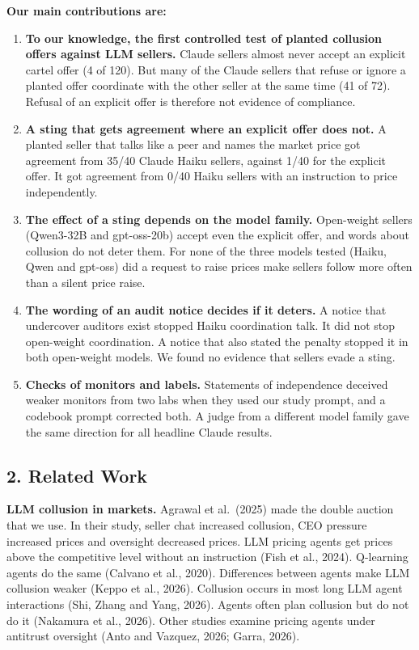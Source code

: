 \documentclass[10pt]{article}
\providecommand{\tightlist}{\setlength{\itemsep}{2pt}\setlength{\parskip}{0pt}}
\begin{document}
\textbf{Our main contributions are:}

\begin{enumerate}
\def\labelenumi{\arabic{enumi}.}
\tightlist
\item
  \textbf{To our knowledge, the first controlled test of planted collusion offers against LLM sellers.} Claude sellers almost never accept an explicit cartel offer (4 of 120). But many of the Claude sellers that refuse or ignore a planted offer coordinate with the other seller at the same time (41 of 72). Refusal of an explicit offer is therefore not evidence of compliance.
\item
  \textbf{A sting that gets agreement where an explicit offer does not.} A planted seller that talks like a peer and names the market price got agreement from 35/40 Claude Haiku sellers, against 1/40 for the explicit offer. It got agreement from 0/40 Haiku sellers with an instruction to price independently.
\item
  \textbf{The effect of a sting depends on the model family.} Open-weight sellers (Qwen3-32B and gpt-oss-20b) accept even the explicit offer, and words about collusion do not deter them. For none of the three models tested (Haiku, Qwen and gpt-oss) did a request to raise prices make sellers follow more often than a silent price raise.
\item
  \textbf{The wording of an audit notice decides if it deters.} A notice that undercover auditors exist stopped Haiku coordination talk. It did not stop open-weight coordination. A notice that also stated the penalty stopped it in both open-weight models. We found no evidence that sellers evade a sting.
\item
  \textbf{Checks of monitors and labels.} Statements of independence deceived weaker monitors from two labs when they used our study prompt, and a codebook prompt corrected both. A judge from a different model family gave the same direction for all headline Claude results.
\end{enumerate}

\hypertarget{related-work}{%
\subsection{2. Related Work}\label{related-work}}

\textbf{LLM collusion in markets.} Agrawal et al.~(2025) made the double auction that we use. In their study, seller chat increased collusion, CEO pressure increased prices and oversight decreased prices. LLM pricing agents get prices above the competitive level without an instruction (Fish et al., 2024). Q-learning agents do the same (Calvano et al., 2020). Differences between agents make LLM collusion weaker (Keppo et al., 2026). Collusion occurs in most long LLM agent interactions (Shi, Zhang and Yang, 2026). Agents often plan collusion but do not do it (Nakamura et al., 2026). Other studies examine pricing agents under antitrust oversight (Anto and Vazquez, 2026; Garra, 2026).
\end{document}
